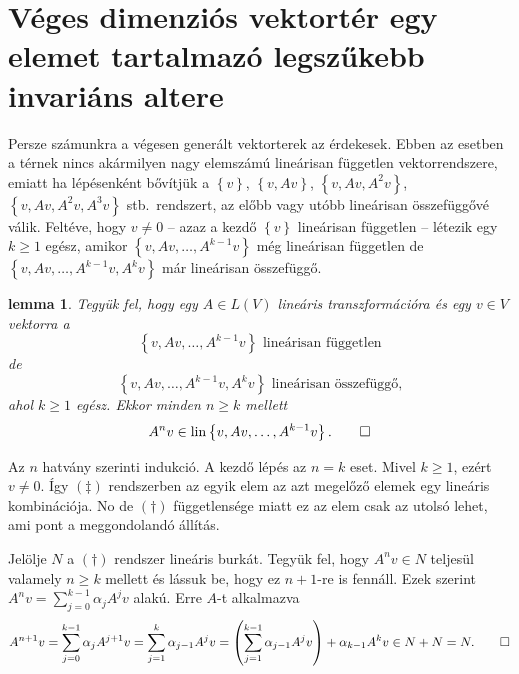 \documentclass[a4paper, showtrims]{memoir}
\makeatletter
\renewenvironment{proof}[1][\proofname]
    {\par\pushQED{\qed}%
    \normalfont \topsep6\p@\@plus6\p@\relax
    \trivlist
    \item[\hskip\labelsep
        \itshape
    #1\@addpunct{:}]\ignorespaces}
    {\popQED\endtrivlist\@endpefalse}
\theoremstyle{plain}
\newtheorem{lemma}[proposition]{lemma}
\theoremstyle{remark}
\theoremstyle{definition}
\DeclareMathOperator{\lin}{lin}
\makeatother
\begin{document}
\section{Véges dimenziós vektortér egy elemet tartalmazó legszűkebb invariáns altere}
Persze számunkra a végesen generált vektorterek az érdekesek.
Ebben az esetben a térnek nincs akármilyen nagy elemszámú lineárisan független vektorrendszere,
emiatt ha lépésenként bővítjük a 
$\left\{ v \right\}$,
$\left\{ v, Av \right\}$,
$\left\{ v, Av, A^2v \right\}$,
$\left\{ v, Av, A^2v, A^3v \right\}$
stb.~rendszert, az előbb vagy utóbb lineárisan összefüggővé válik.
Feltéve, hogy $v\neq 0$ -- azaz a kezdő $\left\{ v \right\}$ lineárisan független --
létezik egy $k\geq 1$ egész, amikor 
	\(
		\left\{ v,Av,\ldots,A^{k-1}v \right\} 
	\)
még lineárisan független
de
	\(
		\left\{ v,Av,\ldots,A^{k-1}v, A^kv \right\} 
	\)
már lineárisan összefüggő.
\begin{lemma}
	Tegyük fel, hogy egy $A\in L\left( V \right)$ lineáris transzformációra és egy
	$v\in V$ vektorra a
	\[
        \left\{ v,Av,\ldots,A^{k-1}v \right\} \text{ lineárisan független}\tag{\dag}
	\]
	de
	\[
        \left\{ v,Av,\ldots,A^{k-1}v, A^kv \right\} \text{ lineárisan összefüggő,}\tag{\ddag}
	\]
    ahol $k\geq 1$ egész.
	Ekkor minden $n\geq k$ mellett
	\[
		A^nv\in\lin\left\{ v,Av,\ldots,A^{k-1}v \right\}.\qedhere
	\]
	\label{le:of}
\end{lemma}
\begin{proof}
    Az $n$ hatvány szerinti indukció.
    A kezdő lépés az $n=k$ eset.
    Mivel $k\geq 1$, ezért $v\neq 0$.
    Így $(\ddag)$ rendszerben az egyik elem az azt megelőző elemek egy lineáris kombinációja.
    No de $\left( \dag \right)$ függetlensége miatt ez az elem csak az utolsó lehet, ami pont 
    a meggondolandó állítás.

    Jelölje $N$ a $\left( \dag \right)$ rendszer lineáris burkát.
    Tegyük fel, hogy $A^nv\in N$ teljesül valamely $n\geq k$ mellett és lássuk be, hogy ez $n+1$-re
    is fennáll.
	Ezek szerint
	\begin{math}
		A^{n}v=\sum_{j=0}^{k-1}\alpha_jA^jv
	\end{math}
	alakú. Erre $A$-t alkalmazva
	\begin{displaymath}
		A^{n+1}v
		=
		\sum_{j=0}^{k-1}\alpha_jA^{j+1}v
		=
		\sum_{j=1}^{k}\alpha_{j-1}A^{j}v
		=
		\left( \sum_{j=1}^{k-1}\alpha_{j-1}A^{j}v \right)+\alpha_{k-1}A^kv\in N+N=N.\qedhere
	\end{displaymath}
\end{proof}
\end{document}
